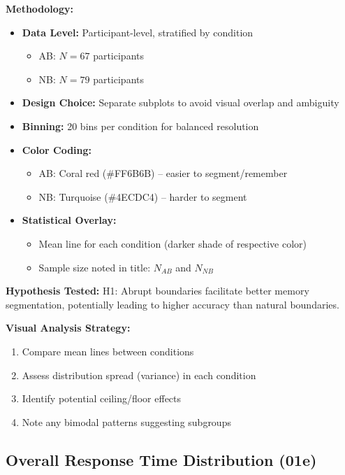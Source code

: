 \documentclass[12pt,a4paper]{article}
\begin{document}
\textbf{Methodology:}
\begin{itemize}
    \item \textbf{Data Level:} Participant-level, stratified by condition
        \begin{itemize}
            \item AB: $N=67$ participants
            \item NB: $N=79$ participants
        \end{itemize}
    \item \textbf{Design Choice:} Separate subplots to avoid visual overlap and ambiguity
    \item \textbf{Binning:} 20 bins per condition for balanced resolution
    \item \textbf{Color Coding:}
        \begin{itemize}
            \item AB: Coral red (\#FF6B6B) -- easier to segment/remember
            \item NB: Turquoise (\#4ECDC4) -- harder to segment
        \end{itemize}
    \item \textbf{Statistical Overlay:}
        \begin{itemize}
            \item Mean line for each condition (darker shade of respective color)
            \item Sample size noted in title: $N_{AB}$ and $N_{NB}$
        \end{itemize}
\end{itemize}

\textbf{Hypothesis Tested:} H1: Abrupt boundaries facilitate better memory segmentation, potentially leading to higher accuracy than natural boundaries.

\textbf{Visual Analysis Strategy:}
\begin{enumerate}
    \item Compare mean lines between conditions
    \item Assess distribution spread (variance) in each condition
    \item Identify potential ceiling/floor effects
    \item Note any bimodal patterns suggesting subgroups
\end{enumerate}

\subsection{Overall Response Time Distribution (01e)}
\end{document}
